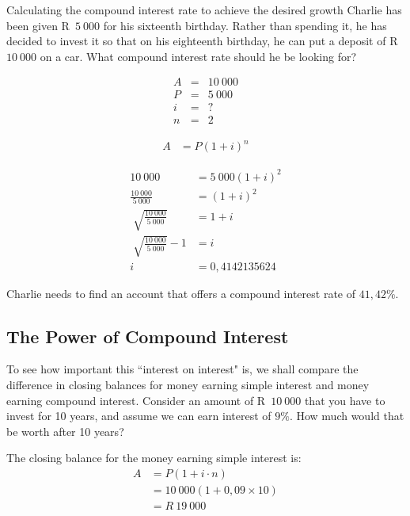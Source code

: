\begin{wex}{Calculating the compound interest rate to achieve the desired growth}{
    Charlie has been given R~$5~000$ for his sixteenth birthday. Rather than spending it, he has decided to invest it so that on his eighteenth birthday, he can put a deposit of R~$10~000$ on a car. What compound interest rate should he be looking for?}{
    
    \begin{eqnarray*}
	A &=& 10~000\\
	P &=& 5~000\\
	i &=& ?\\
	n &=& 2
    \end{eqnarray*}

    \begin{align*}
	A &= P(1 + i)^n
    \end{align*}

    \begin{align*}
	10~000 &= 5~000(1 + i)^2\\
	\frac{10~000}{5~000}&= (1 +i)^2\\
	\sqrt[]{\frac{10~000}{5~000}} &= 1 + i\\
	\sqrt[]{\frac{10~000}{5~000}} - 1 &= i\\
	i &= 0,4142135624
    \end{align*}

    Charlie needs to find an account that offers a compound interest rate of $41,42\%$.
    }
\end{wex}


\subsection{The Power of Compound Interest}

To see how important this “interest on interest" is, we shall compare the difference in closing balances for money earning simple interest and money earning compound interest. Consider an amount of R~$10~000$ that you have to invest for 10 years, and assume we can earn interest of $9\%$. How much would that be worth after 10 years?\par

The closing balance for the money earning simple interest is:
\begin{align*}
    A &= P(1 + i \cdot n)\\
      &= 10~000(1 + 0,09 \times 10)\\
      &= R~19~000\\
\end{align*}

